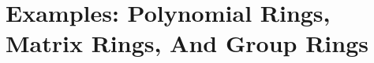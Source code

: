 \documentclass[9pt]{book}
\begin{document}
\begin{comment}
      \section{Homomorphisms And Isomorphisms}
         
      \section{Group Actions}
         
         
   \chapter{Subgroups}
      \section{Definition And Examples}
         
      \section{Centralizers And Normalizers, Stabilizes And Kernels}
         
      \section{Cyclic Groups And Cyclic Subgroups}
         
      \section{Subgroups Generated By Subsets Of A Group}
         
      \section{The Lattice Of Subgroups Of A Subgroup}
         
         
   \chapter{Introduction To Rings}
      \section{Basic Definition And Examples}
         
\end{comment}
      \section{Examples: Polynomial Rings, Matrix Rings, And Group Rings}
         
\end{document}
